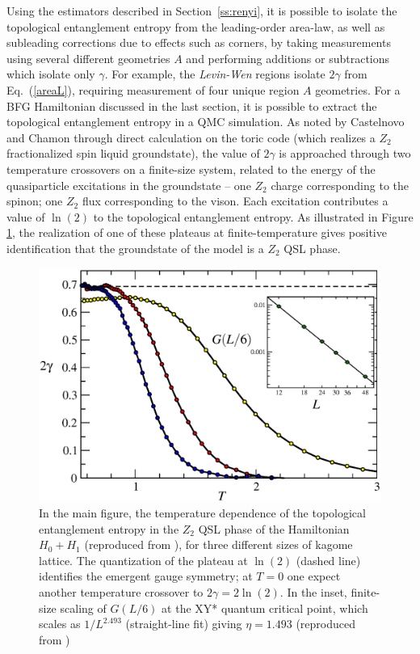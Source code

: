 \documentclass[range]{ar2e}
\begin{document}
Using the estimators described in Section~\ref{ss:renyi}, it is possible to isolate the topological entanglement entropy from the leading-order area-law, as well as subleading corrections due to effects such as corners, by taking measurements using several different geometries $A$ and performing additions or subtractions which isolate only $\gamma$.  For example, the {\it Levin-Wen} \cite{LW} regions isolate $2\gamma$ from Eq.~(\ref{areaL}), requiring measurement of four unique region $A$ geometries.  For a BFG Hamiltonian discussed in the last section, it is possible to extract the topological entanglement entropy in a QMC simulation.  As noted by Castelnovo and Chamon \cite{castelnovo} through direct calculation on the toric code (which realizes a $Z_2$ fractionalized spin liquid groundstate), the value of $2\gamma$ is approached through two temperature crossovers on a finite-size system, related to the energy of the quasiparticle excitations in the groundstate -- one $Z_2$ charge corresponding to the spinon; one $Z_2$ flux corresponding to the vison.  Each excitation contributes a value of $\ln(2)$ to the topological entanglement entropy.  As illustrated in Figure \ref{QSLfig}, the realization of one of these plateaus at finite-temperature gives positive identification that the groundstate of the model is a $Z_2$ QSL phase.

\begin{figure}
\includegraphics[width=5.5in]{QSL}
\caption{In the main figure, the temperature dependence of the topological entanglement entropy in the $Z_2$ QSL phase of the Hamiltonian $H_0 + H_1$ (reproduced from \cite{TopoEE}), for three different sizes of kagome lattice.  The quantization of the plateau at $\ln(2)$ (dashed line) identifies the emergent gauge symmetry; at $T=0$ one expect another temperature crossover to $2 \gamma = 2 \ln(2)$.  In the inset, finite-size scaling of
$G(L/6)$ at the XY* quantum critical point, which scales as  $1/L^{2.493}$ (straight-line fit) giving $\eta = 1.493$ (reproduced from \cite{XYstarQMC})
\label{QSLfig}}
\end{figure}
\end{document}
